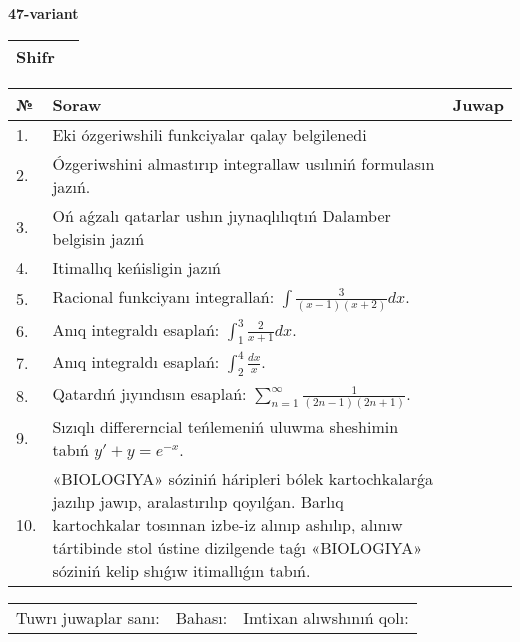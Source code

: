 \documentclass{article}
\begin{document}
  \egroup
  
  \newpage
  
  
  \textbf{47-variant}\\
  
  \bgroup
  \def\arraystretch{1.6} %
  
  \begin{tabular}{|m{5.7cm}|m{9.5cm}|}
  \hline
  Shifr & \\
  \hline
  \end{tabular}
  
  \vspace{1cm}
  
  \begin{tabular}{|m{0.7cm}|m{10cm}|m{4cm}|}
  \hline
  № & Soraw & Juwap \\
  \hline
  1. & Eki ózgeriwshili funkciyalar qalay belgilenedi &  \\
  \hline
  2. & Ózgeriwshini almastırıp integrallaw usılıniń formulasın jazıń. &  \\
  \hline
  3. & Oń aǵzalı qatarlar ushın jıynaqlılıqtıń Dalamber belgisin jazıń &  \\
  \hline
  4. & Itimallıq keńisligin jazıń &  \\
  \hline
  5. & Racional funkciyanı integrallań: \(\int{\frac{3}{(x - 1)(x + 2)}dx}\). &  \\
  \hline
  6. & Anıq integraldı esaplań: \(\int_{1}^{3}\frac{2}{x + 1}dx\). &  \\
  \hline
  7. & Anıq integraldı esaplań: \(\int_{2}^{4}\frac{dx}{x}\). &  \\
  \hline
  8. & Qatardıń jıyındısın esaplań: \(\sum_{n = 1}^{\infty}\frac{1}{(2n - 1)(2n + 1)}\). &  \\
  \hline
  9. & Sızıqlı differerncial teńlemeniń uluwma sheshimin tabıń \(y' + y = e^{- x}\). &  \\
  \hline
  10. & «BIOLOGIYA» sóziniń háripleri bólek kartochkalarǵa jazılıp jawıp, aralastırılıp qoyılǵan. Barlıq kartochkalar tosınnan izbe-iz alınıp ashılıp, alınıw tártibinde stol ústine dizilgende taǵı «BIOLOGIYA» sóziniń kelip shıǵıw itimallıǵın tabıń. &  \\
  \hline
  \end{tabular}
  
  \vspace{1cm}
  
  \begin{tabular}{lll}
  Tuwrı juwaplar sanı: \underline{\hspace{1.5cm}} & 
  Bahası: \underline{\hspace{1.5cm}} & 
  Imtixan alıwshınıń qolı: \underline{\hspace{2cm}} \\
  \end{tabular}
  
\end{document}
